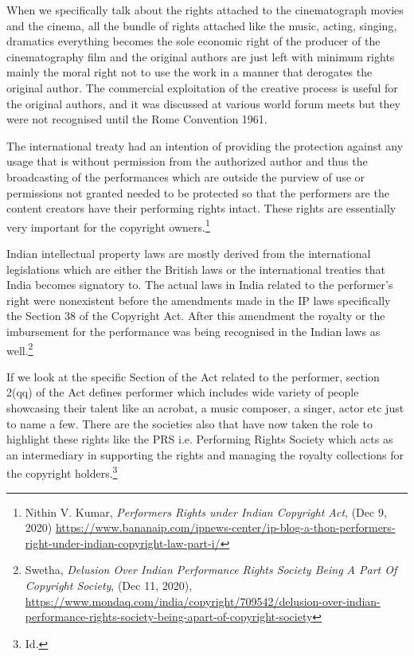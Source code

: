 \begin{multicols}{2}
\noi
When we specifically talk about the rights attached to the cinematograph movies and the
cinema, all the bundle of rights attached like the music, acting, singing, dramatics everything
becomes the sole economic right of the producer of the cinematography film and the original
authors are just left with minimum rights mainly the moral right not to use the work in a
manner that derogates the original author. The commercial exploitation of the creative
process is useful for the original authors, and it was discussed at various world forum meets
but they were not recognised until the Rome Convention 1961.

\noi
The international treaty had an intention of providing the protection against any usage that is
without permission from the authorized author and thus the broadcasting of the performances
which are outside the purview of use or permissions not granted needed to be protected so
that the performers are the content creators have their performing rights intact. These rights
are essentially very important for the copyright owners.\footnote{Nithin V. Kumar, \textit{Performers Rights under Indian Copyright Act}, (Dec 9, 2020) \url{https://www.bananaip.com/ipnews-center/ip-blog-a-thon-performers-right-under-indian-copyright-law-part-i/}}

\noi
Indian intellectual property laws are mostly derived from the international legislations which
are either the British laws or the international treaties that India becomes signatory to. The
actual laws in India related to the performer’s right were nonexistent before the amendments
made in the IP laws specifically the Section 38 of the Copyright Act. After this amendment
the royalty or the imbursement for the performance was being recognised in the Indian laws
as well.\footnote{Swetha, \textit{Delusion Over Indian Performance Rights Society Being A Part Of Copyright Society}, (Dec 11, 2020),\\
\url{https://www.mondaq.com/india/copyright/709542/delusion-over-indian-performance-rights-society-being-apart-of-copyright-society}}

\noi
If we look at the specific Section of the Act related to the performer, section 2(qq) of the Act
defines performer which includes wide variety of people showcasing their talent like an
acrobat, a music composer, a singer, actor etc just to name a few. There are the societies also
that have now taken the role to highlight these rights like the PRS i.e. Performing Rights
Society which acts as an intermediary in supporting the rights and managing the royalty
collections for the copyright holders.\footnote{Id.}


\end{multicols}
